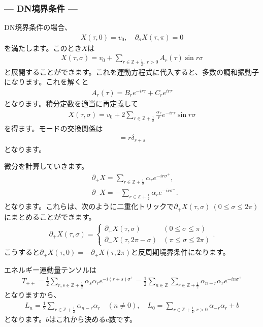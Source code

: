 \documentclass[report,paper=a4, fontsize=12pt, line_length=16cm, number_of_lines=33,dvipdfmx]{jlreq}
\numberwithin{equation}{chapter}
\numberwithin{equation}{section}
\newcommand{\Zb}{\mathbb{Z}}
\newcommand{\del}{\partial}
\newcommand{\Zbh}{\Zb+\frac12}
\begin{document}
\subsubsection*{--- DN境界条件 ---}
DN境界条件の場合、
\begin{align}
  X(\tau,0)=v_0,\quad \del_{\sigma}X(\tau,\pi)=0
\end{align}
を満たします。このとき$X$は
\begin{align}
  X(\tau,\sigma)=v_0+\sum_{r\in \Zbh,\ r>0}A_{r}(\tau)\sin r\sigma
\end{align}
と展開することができます。これを運動方程式に代入すると、多数の調和振動子になります。これを解くと
\begin{align}
  A_{r}(\tau)=B_{r}e^{-ir\tau}+C_{r}e^{ir\tau}
\end{align}
となります。積分定数を適当に再定義して
\begin{align}
  X(\tau,\sigma)=v_{0}+2\sum_{r\in \Zbh}\frac{\alpha_{r}}{r}e^{-ir\tau}\sin r\sigma
\end{align}
を得ます。モードの交換関係は
\begin{align}
  [\alpha_{r},\alpha_{s}]=r\delta_{r+s}
\end{align}
となります。

微分を計算していきます。
\begin{align}
  &\del_{+}X=\sum_{r\in \Zbh}\alpha_{r}e^{-ir\sigma^{+}},\\
  &\del_{-}X=-\sum_{r\in \Zbh}\alpha_{r}e^{-ir\sigma^{-}}.
\end{align}
となります。これらは、次のように二重化トリックで$\del_{+}X(\tau,\sigma)\ (0\le \sigma \le 2\pi)$にまとめることができます。
\begin{align}
  \del_{+}X(\tau,\sigma)=
  \begin{cases}
    \del_{+}X(\tau,\sigma)& (0\le \sigma \le \pi)\\
    \del_{-}X(\tau,2\pi-\sigma) & (\pi\le \sigma \le 2\pi)
  \end{cases}.
\end{align}
こうすると$\del_{+}X(\tau,0)=-\del_{+}X(\tau,2\pi)$と反周期境界条件になります。

エネルギー運動量テンソルは
\begin{align}
  T_{++}
  =\frac12 \sum_{r,s\in \Zbh}\alpha_{s}\alpha_{r} e^{-i(r+s)\sigma^{+}}
  =\frac12 \sum_{n\in\Zb}\sum_{r\in \Zbh}\alpha_{n-r}\alpha_{r} e^{-in\sigma^{+}}
\end{align}
となりますから、
\begin{align}
  L_{n}=\frac12 \sum_{r\in \Zbh}
  \alpha_{n-r}\alpha_{r}\quad (n\ne 0),\quad
  L_{0}=\sum_{r\in \Zbh,r>0}\alpha_{-r}\alpha_{r}+b
\end{align}
となります。$b$はこれから決めるc数です。
\end{document}

